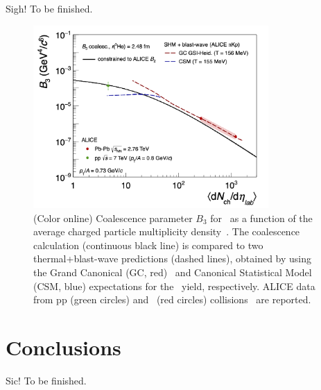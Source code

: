 \documentclass{appolb}
\begin{document}
Sigh! To be finished.

\begin{figure}[htb]
\begin{center}
\includegraphics[width=0.8\textwidth]{B3vsMult073.png}
\caption{(Color online) Coalescence parameter $B_3$ for \hethree~as a function of the average charged particle multiplicity density~\avdNdeta. The coalescence calculation (continuous black line) is compared to two thermal+blast-wave predictions (dashed lines), obtained by using the Grand Canonical (GC, red)~\cite{Andronic:2017} and Canonical Statistical Model (CSM, blue) \cite{Vovchenko:2018fiy} expectations for the \hethree~yield, respectively. ALICE data from pp (green circles) and \PbPb~(red circles) collisions~\cite{ALICE:nucleipp2017,ALICE:deuteronppPbPb2015} are reported. }
\label{Fig:3He}
\end{center}
\end{figure} 

\section{Conclusions}
Sic! To be finished.
\newpage
 	

\end{document}
